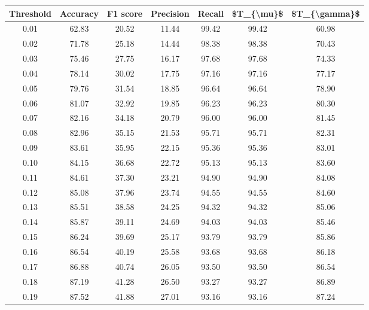 \begin{tabular}{|c|c|c|c|c|c|c|}
\toprule
 Threshold &  Accuracy &  F1 score &  Precision &  Recall &  \$T\_\{\textbackslash mu\}\$ &  \$T\_\{\textbackslash gamma\}\$ \\
\hline
      0.01 &     62.83 &     20.52 &      11.44 &   99.42 &      99.42 &         60.98 \\
      0.02 &     71.78 &     25.18 &      14.44 &   98.38 &      98.38 &         70.43 \\
      0.03 &     75.46 &     27.75 &      16.17 &   97.68 &      97.68 &         74.33 \\
      0.04 &     78.14 &     30.02 &      17.75 &   97.16 &      97.16 &         77.17 \\
      0.05 &     79.76 &     31.54 &      18.85 &   96.64 &      96.64 &         78.90 \\
      0.06 &     81.07 &     32.92 &      19.85 &   96.23 &      96.23 &         80.30 \\
      0.07 &     82.16 &     34.18 &      20.79 &   96.00 &      96.00 &         81.45 \\
      0.08 &     82.96 &     35.15 &      21.53 &   95.71 &      95.71 &         82.31 \\
      0.09 &     83.61 &     35.95 &      22.15 &   95.36 &      95.36 &         83.01 \\
      0.10 &     84.15 &     36.68 &      22.72 &   95.13 &      95.13 &         83.60 \\
      0.11 &     84.61 &     37.30 &      23.21 &   94.90 &      94.90 &         84.08 \\
      0.12 &     85.08 &     37.96 &      23.74 &   94.55 &      94.55 &         84.60 \\
      0.13 &     85.51 &     38.58 &      24.25 &   94.32 &      94.32 &         85.06 \\
      0.14 &     85.87 &     39.11 &      24.69 &   94.03 &      94.03 &         85.46 \\
      0.15 &     86.24 &     39.69 &      25.17 &   93.79 &      93.79 &         85.86 \\
      0.16 &     86.54 &     40.19 &      25.58 &   93.68 &      93.68 &         86.18 \\
      0.17 &     86.88 &     40.74 &      26.05 &   93.50 &      93.50 &         86.54 \\
      0.18 &     87.19 &     41.28 &      26.50 &   93.27 &      93.27 &         86.89 \\
      0.19 &     87.52 &     41.88 &      27.01 &   93.16 &      93.16 &         87.24 \\

\end{tabular}
